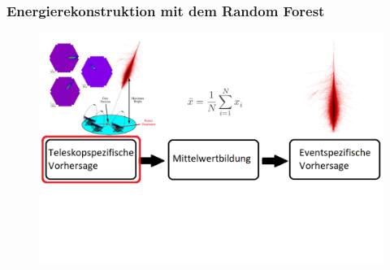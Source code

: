\documentclass[aspectratio=1610, professionalfonts, 9pt]{beamer}
\begin{document}
  \begin{frame}
    \frametitle{Energierekonstruktion mit dem Random Forest}
    \begin{figure}
      \includegraphics[width=\textwidth]{pictures/Ablauf10.png}
      \caption{}
      \label{}
    \end{figure}
  \end{frame}
\end{document}
